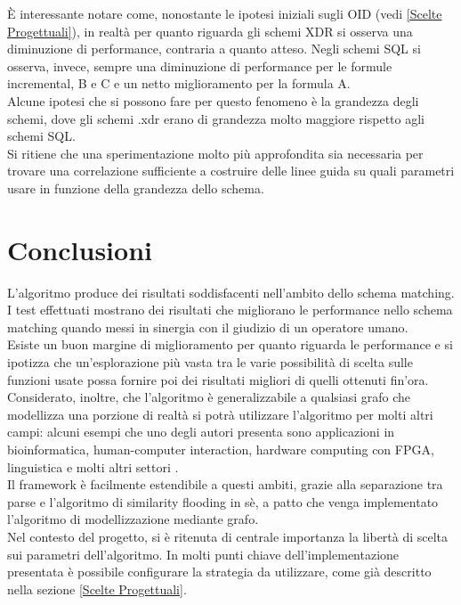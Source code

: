 \documentclass[a4paper,10pt]{article}
\begin{document}
È interessante notare come, nonostante le ipotesi iniziali sugli OID (vedi \ref{Scelte Progettuali}), in realtà per quanto riguarda gli schemi XDR si osserva una diminuzione di performance, contraria a quanto atteso. Negli schemi SQL si osserva, invece, sempre una diminuzione di performance per le formule incremental, B e C e un netto miglioramento per la formula A.\\

Alcune ipotesi che si possono fare per questo fenomeno è la grandezza degli schemi, dove gli schemi .xdr erano di grandezza molto maggiore rispetto agli schemi SQL.\\

Si ritiene che una sperimentazione molto più approfondita sia necessaria per trovare una correlazione sufficiente a costruire delle linee guida su quali parametri usare in funzione della grandezza dello schema.

\section{Conclusioni}

L’algoritmo produce dei risultati soddisfacenti nell’ambito dello schema matching. I test effettuati mostrano dei risultati che migliorano le performance nello schema matching quando messi in sinergia con il giudizio di un operatore umano.\\

Esiste un buon margine di miglioramento per quanto riguarda le performance e si ipotizza che un'esplorazione più vasta tra le varie possibilità di scelta sulle funzioni usate possa fornire poi dei risultati migliori di quelli ottenuti fin'ora.\\

Considerato, inoltre, che l’algoritmo è generalizzabile a qualsiasi grafo che modellizza una porzione di realtà si potrà utilizzare l’algoritmo per molti altri campi: alcuni esempi che uno degli autori presenta sono applicazioni in bioinformatica, human-computer interaction, hardware computing con FPGA, linguistica e molti altri settori \cite{decade_after_flooding}.\\

Il framework è facilmente estendibile a questi ambiti, grazie alla separazione tra parse e l’algoritmo di similarity flooding in sè, a patto che venga implementato l’algoritmo di modellizzazione mediante grafo.\\

Nel contesto del progetto, si è ritenuta di centrale importanza la libertà di scelta sui parametri dell’algoritmo. In molti punti chiave dell’implementazione presentata è possibile configurare la strategia da utilizzare, come già descritto nella sezione \ref{Scelte Progettuali}.\\
\end{document}
